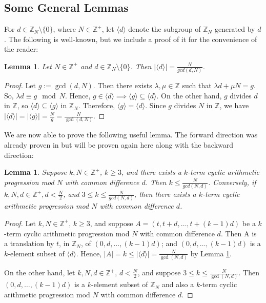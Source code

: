 \documentclass{article}
\newtheorem{lemma}[theorem]{Lemma}
\theoremstyle{definition}
\theoremstyle{remark}
\begin{document}
\subsection{Some General Lemmas}

For $d \in \mathbb{Z}_{N} \setminus \{0\}$, where $N \in \mathbb{Z}^{+}$, let $\langle d \rangle$ denote the subgroup of $\mathbb{Z}_{N}$ generated by $d$. The following is well-known, but we include a proof of it for the convenience of the reader:

\begin{lemma}
\label{lem:1.1}
    Let $N \in \mathbb{Z}^{+}$ and $d \in \mathbb{Z}_{N} \setminus \{0\}$. Then $|\langle d \rangle| = \frac{N}{gcd(d,N)}$.
\end{lemma}

\begin{proof}
    Let $g := \gcd(d,N)$. Then there exists $\lambda,\mu \in \mathbb{Z}$ such that $\lambda d + \mu N = g$. So, $\lambda d \equiv g \mod N$. Hence, $g \in \langle d \rangle \implies \langle g \rangle \subseteq \langle d \rangle$. On the other hand, $g$ divides $d$ in $\mathbb{Z}$, so $\langle d \rangle \subseteq \langle g \rangle$ in $\mathbb{Z}_{N}$. Therefore, $\langle g \rangle = \langle d \rangle$. Since $g$ divides $N$ in $\mathbb{Z}$, we have $|\langle d\rangle| = |\langle g \rangle | = \frac{N}{g} = \frac{N}{\gcd(d,N)}$.
\end{proof}

We are now able to prove the following useful lemma. The forward direction was already proven in \cite{Berglund} but will be proven again here along with the backward direction:

\begin{lemma}
\label{lem:1.2}
    Suppose $k, N \in \mathbb{Z}^{+}$, $k \geq 3$, and there exists a $k$-term cyclic arithmetic progression mod $N$ with common difference $d$. Then $k \leq \frac{N}{gcd(N,d)}$. Conversely, if $k, N, d \in \mathbb{Z}^{+}, d < \frac{N}{2}$, and $3 \leq k \leq \frac{N}{gcd(N,d)}$, then there exists a $k$-term cyclic arithmetic progression mod $N$ with common difference $d$.
\end{lemma}

\begin{proof}
    Let $k,N \in \mathbb{Z}^{+}$, $k \geq 3$, and suppose
    $A = (t,t+d,\ldots,t+(k-1)d)$ be a $k$-term cyclic arithmetic progression mod $N$ with common difference $d$. Then A is a translation by $t$, in $\mathbb{Z}_{N}$, of $(0,d,\ldots,(k-1)d)$; and $(0,d,\ldots,(k-1)d)$ is a $k$-element subset of $\langle d \rangle$. Hence, $|A| = k \leq |\langle d \rangle | = \frac{N}{\gcd(N,d)}$ by Lemma \ref{lem:1.1}.

    On the other hand, let $k,N,d \in \mathbb{Z}^{+}$, $d < \frac{N}{2}$, and suppose $3 \leq k \leq \frac{N}{\gcd(N,d)}$. Then $(0,d,\ldots,(k-1)d)$ is a $k$-element subset of $\mathbb{Z}_{N}$ and also a $k$-term cyclic arithmetic progression mod $N$ with common difference $d$.
\end{proof}
\end{document}
